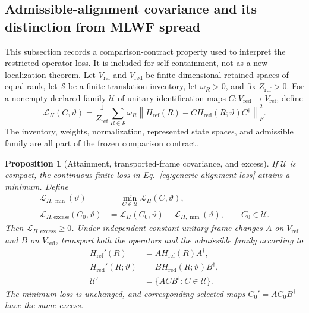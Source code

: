 \documentclass[11pt]{article}
\newcommand{\norm}[1]{\left\lVert #1\right\rVert}
\newtheorem{proposition}[theorem]{Proposition}
\begin{document}
\subsection{Admissible-alignment covariance and its distinction from MLWF spread}
\label{sec:alignment-covariance}

This subsection records a comparison-contract property used to interpret the restricted
operator loss. It is included for self-containment, not as a new localization theorem.
Let $V_{\mathrm{ref}}$ and $V_{\mathrm{red}}$ be finite-dimensional retained spaces of
equal rank, let $\mathcal S$ be a finite translation inventory, let $\omega_R>0$, and
fix $Z_{\mathrm{ref}}>0$. For a nonempty declared family $\mathcal U$ of unitary
identification maps $C:V_{\mathrm{red}}\to V_{\mathrm{ref}}$, define
\begin{equation}
 \mathcal L_H(C,\vartheta)
 =\frac{1}{Z_{\mathrm{ref}}}
  \sum_{R\in\mathcal S}\omega_R
  \norm{H_{\mathrm{ref}}(R)
  -C H_{\mathrm{red}}(R;\vartheta)C^\dagger}_F^2.
 \label{eq:generic-alignment-loss}
\end{equation}
The inventory, weights, normalization, represented state spaces, and admissible family
are all part of the frozen comparison contract.

\begin{proposition}[Attainment, transported-frame covariance, and excess]
\label{prop:alignment-covariance}
If $\mathcal U$ is compact, the continuous finite loss in
Eq.~\eqref{eq:generic-alignment-loss} attains a minimum. Define
\begin{align}
 \mathcal L_{H,\min}(\vartheta)
 &=\min_{C\in\mathcal U}\mathcal L_H(C,\vartheta),\\
 \mathcal L_{H,\mathrm{excess}}(C_0,\vartheta)
 &=\mathcal L_H(C_0,\vartheta)-\mathcal L_{H,\min}(\vartheta),
 \qquad C_0\in\mathcal U.
\end{align}
Then $\mathcal L_{H,\mathrm{excess}}\ge0$. Under independent constant unitary frame
changes $A$ on $V_{\mathrm{ref}}$ and $B$ on $V_{\mathrm{red}}$, transport both the
operators and the admissible family according to
\begin{align}
 H_{\mathrm{ref}}'(R)&=AH_{\mathrm{ref}}(R)A^\dagger,\\
 H_{\mathrm{red}}'(R;\vartheta)&=BH_{\mathrm{red}}(R;\vartheta)B^\dagger,\\
 \mathcal U'&=\{ACB^\dagger:C\in\mathcal U\}.
\end{align}
The minimum loss is unchanged, and corresponding selected maps
$C_0'=AC_0B^\dagger$ have the same excess.
\end{proposition}
\end{document}
